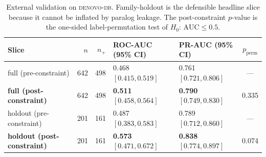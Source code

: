 \documentclass[11pt,a4paper,oneside]{report}
\begin{document}
\begin{table}[H]
\centering
\caption[denovo-db before vs after constraint]{External
validation on \textsc{denovo-db}. Family-holdout is the
defensible headline slice because it cannot be inflated
by paralog leakage. The post-constraint $p$-value is
the one-sided label-permutation test of
$H_0\!:\,\text{AUC}\le 0.5$.}
\label{tab:denovo}
\small
\begin{tabular}{@{} l r r l l c @{}}
\toprule
\textbf{Slice} & $n$ & $n_{+}$ & \textbf{ROC-AUC (95\% CI)} & \textbf{PR-AUC (95\% CI)} & $p_{\text{perm}}$ \\
\midrule
full (pre-constraint)            & 642 & 498 & 0.468 $[0.415, 0.519]$ & 0.761 $[0.721, 0.806]$ & --- \\
\textbf{full (post-constraint)}  & 642 & 498 & \textbf{0.511} $[0.458, 0.564]$ & \textbf{0.790} $[0.749, 0.830]$ & 0.335 \\
holdout (pre-constraint)         & 201 & 161 & 0.487 $[0.383, 0.583]$ & 0.789 $[0.712, 0.860]$ & --- \\
\textbf{holdout (post-constraint)} & 201 & 161 & \textbf{0.573} $[0.471, 0.672]$ & \textbf{0.838} $[0.774, 0.897]$ & 0.074 \\
\bottomrule
\end{tabular}
\end{table}
\end{document}
